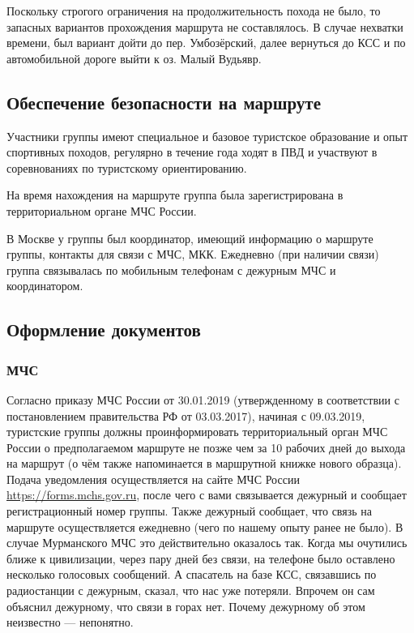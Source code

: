 Поскольку строгого ограничения на продолжительность похода не было, то запасных вариантов прохождения маршрута не
составлялось. В случае нехватки времени, был вариант дойти до пер. Умбозёрский, далее вернуться до КСС
и по автомобильной дороге выйти к оз. Малый Вудьявр.

\subsection{Обеспечение безопасности на маршруте}
Участники группы имеют специальное и базовое туристское образование и опыт спортивных походов, регулярно в течение года ходят в ПВД и участвуют в соревнованиях по туристскому ориентированию.

На время нахождения на маршруте группа была зарегистрирована в территориальном органе МЧС России.

В Москве у группы был координатор, имеющий информацию о маршруте группы, контакты для связи с МЧС, МКК.
Ежедневно (при наличии связи) группа связывалась по мобильным телефонам с дежурным МЧС и координатором.

\subsection{Оформление документов}
\subsubsection{МЧС}
Согласно приказу МЧС России  от 30.01.2019 (утвержденному в соответствии с
постановлением правительства РФ  от 03.03.2017), начиная с 09.03.2019, туристские группы должны
проинформировать территориальный орган МЧС России о предполагаемом маршруте не позже чем за 10 рабочих дней
до выхода на маршрут (о чём также напоминается в маршрутной книжке нового образца).
Подача уведомления осуществляется на сайте МЧС России \textenglish{\url{https://forms.mchs.gov.ru}},
после чего с вами связывается дежурный и сообщает регистрационный номер группы.
Также дежурный сообщает, что связь на маршруте осуществляется ежедневно (чего по нашему опыту ранее не было).
В случае Мурманского МЧС это действительно оказалось так. Когда мы очутились ближе к цивилизации,
через пару дней без связи, на телефоне было оставлено несколько голосовых сообщений.
А спасатель на базе КСС, связавшись по радиостанции с дежурным, сказал, что нас уже потеряли.
Впрочем он сам объяснил дежурному, что связи в горах нет. Почему дежурному об этом неизвестно --- непонятно.

